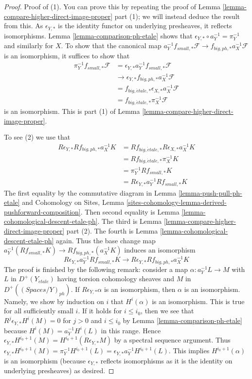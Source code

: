 \documentclass{stacks-project}
\theoremstyle{plain}
\theoremstyle{definition}
\theoremstyle{remark}
\numberwithin{equation}{subsection}
\def\etale{{\acute{e}tale}}
\begin{document}
\begin{proof}
Proof of (1). You can prove this by repeating the proof of
Lemma \ref{lemma-compare-higher-direct-image-proper} part (1);
we will instead deduce the result from this.
As $\epsilon_{Y, *}$ is the identity functor on underlying presheaves,
it reflects isomorphisms. Lemma \ref{lemma-comparison-ph-etale}
shows that $\epsilon_{Y, *} \circ a_Y^{-1} = \pi_Y^{-1}$
and similarly for $X$. To show that the canonical map
$a_Y^{-1}f_{small, *}\mathcal{F} \to f_{big, ph, *}a_X^{-1}\mathcal{F}$
is an isomorphism, it suffices to show that
\begin{align*}
\pi_Y^{-1}f_{small, *}\mathcal{F}
& =
\epsilon_{Y, *}a_Y^{-1}f_{small, *}\mathcal{F} \\
& \to 
\epsilon_{Y, *}f_{big, ph, *}a_X^{-1}\mathcal{F} \\
& =
f_{big, \etale, *} \epsilon_{X, *}a_X^{-1}\mathcal{F} \\
& =
f_{big, \etale, *}\pi_X^{-1}\mathcal{F}
\end{align*}
is an isomorphism. This is part
(1) of Lemma \ref{lemma-compare-higher-direct-image-proper}.

\medskip\noindent
To see (2) we use that
\begin{align*}
R\epsilon_{Y, *}Rf_{big, ph, *}a_X^{-1}K
& =
Rf_{big, \etale, *}R\epsilon_{X, *}a_X^{-1}K \\
& =
Rf_{big, \etale, *}\pi_X^{-1}K \\
& =
\pi_Y^{-1}Rf_{small, *}K \\
& =
R\epsilon_{Y, *} a_Y^{-1}Rf_{small, *}K
\end{align*}
The first equality by the commutative diagram in
Lemma \ref{lemma-push-pull-ph-etale}
and Cohomology on Sites, Lemma
\ref{sites-cohomology-lemma-derived-pushforward-composition}.
Then second equality is Lemma \ref{lemma-cohomological-descent-etale-ph}.
The third is
Lemma \ref{lemma-compare-higher-direct-image-proper} part (2).
The fourth is Lemma \ref{lemma-cohomological-descent-etale-ph} again.
Thus the base change map
$a_Y^{-1}(Rf_{small, *}K) \to Rf_{big, ph, *}(a_X^{-1}K)$
induces an isomorphism
$$
R\epsilon_{Y, *}a_Y^{-1}Rf_{small, *}K \to
R\epsilon_{Y, *}Rf_{big, ph, *}a_X^{-1}K
$$
The proof is finished by the following remark: consider a map
$\alpha : a_Y^{-1}L \to M$ with $L$ in $D^+(Y_\etale)$
having torsion cohomology sheaves
and $M$ in $D^+((\textit{Spaces}/Y)_{ph})$. If
$R\epsilon_{Y, *}\alpha$ is an isomorphism, then $\alpha$ is an isomorphism.
Namely, we show by induction on $i$ that $H^i(\alpha)$ is an isomorphism.
This is true for all sufficiently small $i$.
If it holds for $i \leq i_0$, then we see that
$R^j\epsilon_{Y, *}H^i(M) = 0$ for $j > 0$ and $i \leq i_0$
by Lemma \ref{lemma-comparison-ph-etale}
because $H^i(M) = a_Y^{-1}H^i(L)$ in this range.
Hence $\epsilon_{Y, *}H^{i_0 + 1}(M) = H^{i_0 + 1}(R\epsilon_{Y, *}M)$
by a spectral sequence argument.
Thus $\epsilon_{Y, *}H^{i_0 + 1}(M) = \pi_Y^{-1}H^{i_0 + 1}(L) =
\epsilon_{Y, *}a_Y^{-1}H^{i_0 + 1}(L)$.
This implies $H^{i_0 + 1}(\alpha)$ is an isomorphism
(because $\epsilon_{Y, *}$ reflects isomorphisms as it is the
identity on underlying presheaves) as desired.
\end{proof}

















\end{document}
